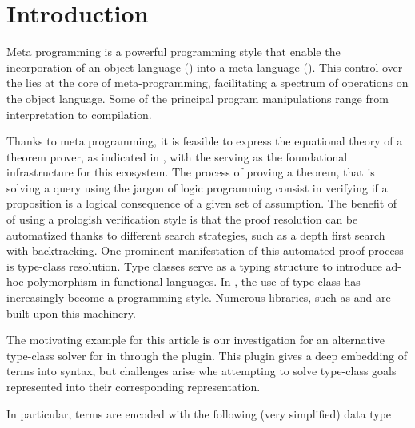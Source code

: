 \documentclass{rapport}
\begin{document}
\section{Introduction}

Meta programming is a powerful programming style that enable the incorporation
of an object language (\ol) into a meta language (\ml). This control over the
\ol lies at the core of meta-programming, facilitating a spectrum of operations
on the object language. Some of the principal program manipulations range
from interpretation to compilation.

Thanks to meta programming, it is feasible to express the equational theory of a
theorem prover, as indicated in \cite{citeX, Y Z}, with the \ml serving as the
foundational infrastructure for this ecosystem. The process of proving a theorem, that is
solving a query using the jargon of logic programming consist in verifying if a
proposition is a logical consequence of a given set of assumption. The benefit
of of using a prologish verification style is that the proof resolution can be
automatized thanks to different search strategies, such as a depth first search
with backtracking. One prominent manifestation of this automated proof process is
type-class resolution\cite{wadler89, sozeau08}. Type classes serve as a typing
structure to introduce ad-hoc polymorphism in functional languages.
In \coq, the use of type class has increasingly become a programming
style. Numerous libraries, such as \stdpp and
\iris are built upon this machinery.

The motivating example for this article is our investigation for an alternative
type-class solver for \coq in \elpi{} through the \coqelpi
plugin. This plugin gives a deep embedding of \coq terms into \elpi syntax, but
challenges arise whe attempting to solve type-class goals represented into their
corresponding \elpi representation.

In particular, \coq terms are encoded with the following (very simplified)
data type

\end{document}
